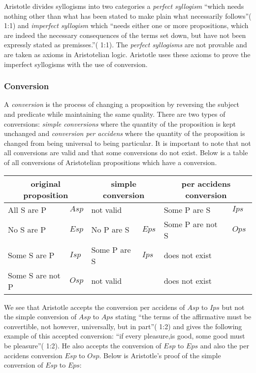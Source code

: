 \documentclass[12pt]{article}
\begin{document}
Aristotle divides syllogisms into two categories a \emph{perfect syllogism} ``which needs nothing other than what has been stated to make plain what necessarily follows''(\cite{AP} 1:1) and \emph{imperfect syllogism} which ``needs either one or more propositions, which are indeed the necessary consequences of the terms set down, but have not been expressly stated as premisses.''(\cite{AP} 1:1).  The \emph{perfect syllogisms} are not provable and are taken as axioms in Aristotelian logic.\cite{LJ}  Aristotle uses these axioms to prove the imperfect syllogisms with the use of conversion.

\subsubsection*{Conversion}
A \emph{conversion} is the process of changing a proposition by reversing the subject and predicate while maintaining the same quality.  There are two types of conversions: \emph{simple conversions} where the quantity of the proposition is kept unchanged and \emph{conversion per accidens} where the quantity of the proposition is changed from being universal to being particular.  It is important to note that not all conversions are valid and that some conversions do not exist.  Below is a table of all conversions of Aristotelian propositions which have a conversion.\cite{PH}
\begin{center}
\begin{tabular}{l l|l l|l l}
\multicolumn{2}{c}{\textbf{original proposition}} & \multicolumn{2}{c}{\textbf{simple conversion}} & \multicolumn{2}{c}{\textbf{per accidens conversion}}\\
\hline
All S are P & $Asp$ & not valid & & Some P are S & $Ips$\\
No S are P & $Esp$ & No P are S & $Eps$ & Some P are not S & $Ops$\\
Some S are P & $Isp$ & Some P are S & $Ips$ & does not exist & \\
Some S are not P & $Osp$ & not valid & & does not exist &
\end{tabular}
\end{center}
We see that Aristotle accepts the conversion per accidens of $Asp$ to $Ips$ but not the simple conversion of $Asp$ to $Aps$ stating ``the terms of the affirmative must be convertible, not however, universally, but in part''(\cite{AP} 1:2) and gives the following example of this accepted conversion: ``if every pleasure,is good, some good must be pleasure''(\cite{AP} 1:2).  He also accepts the conversion of $Esp$ to $Eps$ and also the per accidens conversion $Esp$ to $Osp$.  Below is Aristotle's proof of the simple conversion of $Esp$ to $Eps$:
\end{document}
